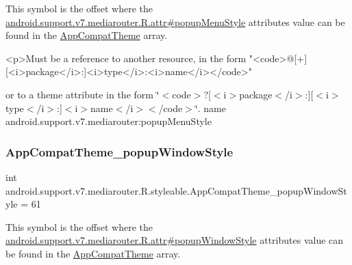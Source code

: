 This symbol is the offset where the \hyperlink{classandroid_1_1support_1_1v7_1_1mediarouter_1_1R_1_1attr_a12b442d2a68fa9805515836034d2148e}{android.\+support.\+v7.\+mediarouter.\+R.\+attr\#popup\+Menu\+Style} attribute\textquotesingle{}s value can be found in the \hyperlink{classandroid_1_1support_1_1v7_1_1mediarouter_1_1R_1_1styleable_a4e3d3900c75d49aeb2f283cac00214d6}{App\+Compat\+Theme} array.

\begin{DoxyVerb}      <p>Must be a reference to another resource, in the form "<code>@[+][<i>package</i>:]<i>type</i>:<i>name</i></code>"
\end{DoxyVerb}
 or to a theme attribute in the form \char`\"{}$<$code$>$?\mbox{[}$<$i$>$package$<$/i$>$\+:\mbox{]}\mbox{[}$<$i$>$type$<$/i$>$\+:\mbox{]}$<$i$>$name$<$/i$>$$<$/code$>$\char`\"{}.  name android.\+support.\+v7.\+mediarouter\+:popup\+Menu\+Style \mbox{\label{classandroid_1_1support_1_1v7_1_1mediarouter_1_1R_1_1styleable_a1c2df8e2b925ae4820688441763caf8b}} 
\subsubsection{\texorpdfstring{App\+Compat\+Theme\+\_\+popup\+Window\+Style}{AppCompatTheme\_popupWindowStyle}}
{\footnotesize\ttfamily int android.\+support.\+v7.\+mediarouter.\+R.\+styleable.\+App\+Compat\+Theme\+\_\+popup\+Window\+Style = 61\hspace{0.3cm}{\ttfamily [static]}}

This symbol is the offset where the \hyperlink{classandroid_1_1support_1_1v7_1_1mediarouter_1_1R_1_1attr_a81365945964f66c87ae40a9a13b9c3c4}{android.\+support.\+v7.\+mediarouter.\+R.\+attr\#popup\+Window\+Style} attribute\textquotesingle{}s value can be found in the \hyperlink{classandroid_1_1support_1_1v7_1_1mediarouter_1_1R_1_1styleable_a4e3d3900c75d49aeb2f283cac00214d6}{App\+Compat\+Theme} array.


